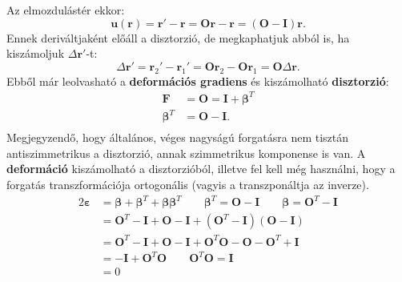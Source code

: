 \documentclass[12pt,a4paper]{scrartcl}
\let\mathbf\bm
\begin{document}
Az elmozdulástér ekkor:
\[{\mathbf{u}}\left( {\mathbf{r}} \right) = {\mathbf{r}}' - {\mathbf{r}} = {\mathbf{Or}} - {\mathbf{r}} = \left( {{\mathbf{O}} - {\mathbf{I}}} \right){\mathbf{r}}.\]
Ennek deriváltjaként előáll a disztorzió, de megkaphatjuk abból is, ha kiszámoljuk $\Delta {\mathbf{r}}'$-t:
\[\Delta {\mathbf{r}}' = {{\mathbf{r}}_2}' - {{\mathbf{r}}_1}' = {\mathbf{O}}{{\mathbf{r}}_2} - {\mathbf{O}}{{\mathbf{r}}_1} = {\mathbf{O}}\Delta {\mathbf{r}}.\]
Ebből már leolvasható a \textbf{deformációs gradiens} és kiszámolható \textbf{disztorzió}:
\[\begin{aligned}
  {\mathbf{F}} &  = {\mathbf{O}} = {\mathbf{I}} + {{\mathbf{\beta }}^T} \\ 
  {{\mathbf{\beta }}^T} &  = {\mathbf{O}} - {\mathbf{I}}. \\ 
\end{aligned} \]
Megjegyzendő, hogy általános, véges nagyságú forgatásra nem tisztán antiszimmetrikus a disztorzió, annak szimmetrikus komponense is van. A \textbf{deformáció} kiszámolható a disztorzióból, illetve fel kell még használni, hogy a forgatás transzformációja ortogonális (vagyis a transzponáltja az inverze).
\[\begin{aligned}
  2{\mathbf{\varepsilon }} &  = {\mathbf{\beta }} + {{\mathbf{\beta }}^T} + {\mathbf{\beta }}{{\mathbf{\beta }}^T}\quad \quad {{\mathbf{\beta }}^T} = {\mathbf{O}} - {\mathbf{I}} \quad \quad {{\mathbf{\beta }}} = {\mathbf{O}^T} - {\mathbf{I}} \\ 
   &  = {{\mathbf{O}}^T} - {\mathbf{I}} + {\mathbf{O}} - {\mathbf{I}} + \left( {{{\mathbf{O}}^T} - {\mathbf{I}}} \right)\left( {{\mathbf{O}} - {\mathbf{I}}} \right) \\ 
   &  = {{\mathbf{O}}^T} - {\mathbf{I}} + {\mathbf{O}} - {\mathbf{I}} + {{\mathbf{O}}^T}{\mathbf{O}} - {\mathbf{O}} - {{\mathbf{O}}^T} + {\mathbf{I}} \\ 
   &  =  - {\mathbf{I}} + {{\mathbf{O}}^T}{\mathbf{O}}\quad \quad {{\mathbf{O}}^T}{\mathbf{O}} = {\mathbf{I}} \\ 
   &  = 0 \\ 
\end{aligned} \]
\end{document}
